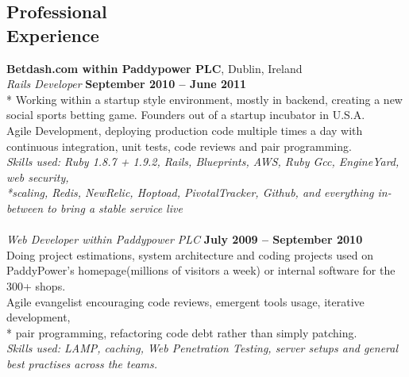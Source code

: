 \documentclass[margin,line]{resume}
\begin{document}
\begin{resume}

    \section{\mysidestyle Professional\\Experience}
    \textbf{Betdash.com within Paddypower PLC}, Dublin, Ireland \vspace{2mm}\\\vspace{1mm}%
    \textsl{Rails Developer} \hfill \textbf{September 2010 -- June 2011}\\*
    Working within a startup style environment, mostly in backend, creating a new social sports betting game. Founders out of a startup incubator in U.S.A. \vspace{1mm}\\%
    Agile Development, deploying production code multiple times a day with continuous integration, unit tests, code reviews and pair programming. \vspace{1mm} \vspace{1mm}\\%
    \textsl{Skills used: Ruby 1.8.7 + 1.9.2, Rails, Blueprints, AWS, Ruby Gcc, EngineYard, web security, \\*scaling, Redis, NewRelic, Hoptoad, PivotalTracker, Github, and everything in-between to bring a stable service live  } \vspace{1mm} \\
    \\ \textsl{Web Developer within Paddypower PLC} \hfill \textbf{July 2009 -- September 2010}\\
    Doing project estimations, system architecture and coding projects used on PaddyPower's homepage(millions of visitors a week) or internal software for the 300+ shops. \vspace{1mm}\\%
    Agile evangelist encouraging code reviews, emergent tools usage, iterative development, \\* pair programming, refactoring code debt rather than simply patching. \vspace{1mm}\\%
    \textsl{Skills used: LAMP, caching, Web Penetration Testing, server setups and general best practises across the teams. } \vspace{1mm}\\%


\end{resume}
\end{document}
